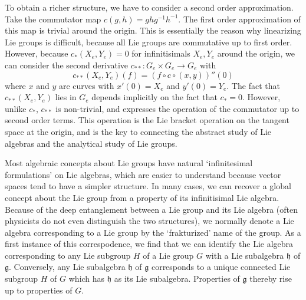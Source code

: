To obtain a richer structure, we have to consider a second order approximation. Take the commutator map $c(g,h) = ghg^{-1}h^{-1}$. The first order approximation of this map is trivial around the origin. This is essentially the reason why linearizing Lie groups is difficult, because all Lie groups are commutative up to first order. However, because $c_*(X_e, Y_e) = 0$ for infinitisimals $X_e, Y_e$ around the origin, we can consider the second derivative $c_{**}: G_e \times G_e \to G_e$ with
%
\[ c_{**}(X_e,Y_e)(f) = (f \circ c \circ (x,y))''(0) \]
%
where $x$ and $y$ are curves with $x'(0) = X_e$ and $y'(0) = Y_e$. The fact that $c_{**}(X_e, Y_e)$ lies in $G_e$ depends implicitly on the fact that $c_* = 0$. However, unlike $c_*$, $c_{**}$ is non-trivial, and expresses the operation of the commutator up to second order terms. This operation is the Lie bracket operation on the tangent space at the origin, and is the key to connecting the abstract study of Lie algebras and the analytical study of Lie groups.

Most algebraic concepts about Lie groups have natural `infinitesimal formulations' on Lie algebras, which are easier to understand because vector spaces tend to have a simpler structure. In many cases, we can recover a global concept about the Lie group from a property of its infinitisimal Lie algebra. Because of the deep entanglement between a Lie group and its Lie algebra (often physicists do not even distinguish the two structures), we normally denote a Lie algebra corresponding to a Lie group by the `frakturized' name of the group. As a first instance of this correspodence, we find that we can identify the Lie algebra corresponding to any Lie subgroup $H$ of a Lie group $G$ with a Lie subalgebra $\mathfrak{h}$ of $\mathfrak{g}$. Conversely, any Lie subalgebra $\mathfrak{h}$ of $\mathfrak{g}$ corresponds to a unique connected Lie subgroup $H$ of $G$ which has $\mathfrak{h}$ as its Lie subalgebra. Properties of $\mathfrak{g}$ thereby rise up to properties of $G$.

